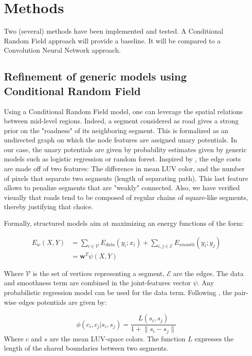 \documentclass[10pt,conference,compsocconf]{IEEEtran}
\begin{document}
\section{Methods}
\label{sec:orgheadline11}
Two (several) methods have been implemented and tested. A Conditional Random Field approach will provide a baseline. It will be compared to a Convolution Neural Network approach.
\subsection{Refinement of generic models using Conditional Random Field}
\label{sec:orgheadline10}
   Using a Conditional Random Field model, one can leverage the spatial relations between mid-level regions. Indeed, a segment considered as road gives a strong prior on the "roadness" of its neighboring segment. This is formalized as an undirected graph on which the node features are assigned unary potentials. In our case, the unary potentials are given by probability estimates given by generic models such as logistic regression or random forest.
Inspired by \cite{fulkerson09}, the edge costs are made off of two features: The difference in mean LUV color, and the number of pixels that separate two segments (length of separating path). This last feature allows to penalize segments that are "weakly" connected. Also, we have verified visually that roads tend to be composed of regular chains of square-like segments, thereby justifying that choice.

Formally, structured models aim at maximizing an energy functions of the form:

 \begin{equation}
 \begin{split}
E_w(X,Y) &= \sum_{i \in \mathcal{V}} E_{data}(y_i;x_i) + \sum_{i,j \in \mathcal{E}} E_{smooth}(y_i;y_j) \\
 &= \mathbf{w}^T \psi(X,Y)
 \end{split}
 \end{equation}

Where \(\mathcal{V}\) is the set of vertices representing a segment, \(\mathcal{E}\) are the edges. The data and smoothness term are combined in the joint-features vector \(\psi\). Any probabilistic regression model can be used for the data term. Following \cite{fulkerson09}, the pair-wise edges potentials are given by:

 \begin{equation}
\phi(c_i,c_j|s_i,s_j) = \frac{L(s_i,s_j)}{1+\lVert s_i - s_j \rVert}
 \end{equation}
Where \(c\) and \(s\) are the mean LUV-space colors. The function \(L\) expresses the length of the shared boundaries between two segments.
\end{document}
